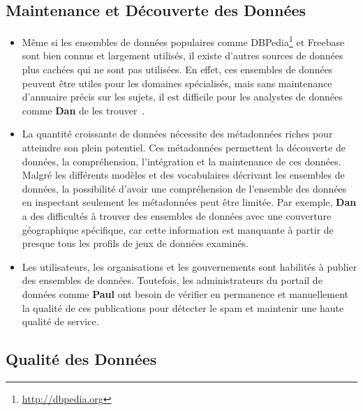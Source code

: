 \subsection{Maintenance et D\'{e}couverte des Donn\'{e}es}

\begin{itemize}
\item Même si les ensembles de donn\'{e}es populaires comme DBPedia\footnote{\url{http://dbpedia.org}} et Freebase sont bien connus et largement utilis\'{e}s, il existe d'autres sources de donn\'{e}es plus cach\'{e}es qui ne sont pas utilis\'{e}es. En effet, ces ensembles de donn\'{e}es peuvent être utiles pour les domaines sp\'{e}cialis\'{e}s, mais sans maintenance d'annuaire pr\'{e}cis sur les sujets, il est difficile pour les analystes de donn\'{e}es comme \textbf{Dan} de les trouver~\cite{Lalithsena:WI:13}.
\item La quantit\'{e} croissante de donn\'{e}es n\'{e}cessite des m\'{e}tadonn\'{e}es riches pour atteindre son plein potentiel. Ces m\'{e}tadonn\'{e}es permettent la d\'{e}couverte de donn\'{e}es, la compr\'{e}hension, l'int\'{e}gration et la maintenance de ces donn\'{e}es. Malgr\'{e} les diff\'{e}rents mod\`{e}les et des vocabulaires d\'{e}crivant les ensembles de donn\'{e}es, la possibilit\'{e} d'avoir une compr\'{e}hension de l'ensemble des donn\'{e}es en inspectant seulement les m\'{e}tadonn\'{e}es peut être limit\'{e}e. Par exemple, \textbf{Dan} a des difficult\'{e}s à trouver des ensembles de donn\'{e}es avec une couverture g\'{e}ographique sp\'{e}cifique, car cette information est manquante à partir de presque tous les profils de jeux de donn\'{e}es examin\'{e}s.
\item Les utilisateurs, les organisations et les gouvernements sont habilit\'{e}s à publier des ensembles de donn\'{e}es. Toutefois, les administrateurs du portail de donn\'{e}es comme \textbf{Paul} ont besoin de v\'{e}rifier en permanence et manuellement la qualit\'{e} de ces publications pour d\'{e}tecter le spam et maintenir une haute qualit\'{e} de service.
\end{itemize}

\subsection{Qualit\'{e} des Donn\'{e}es}

